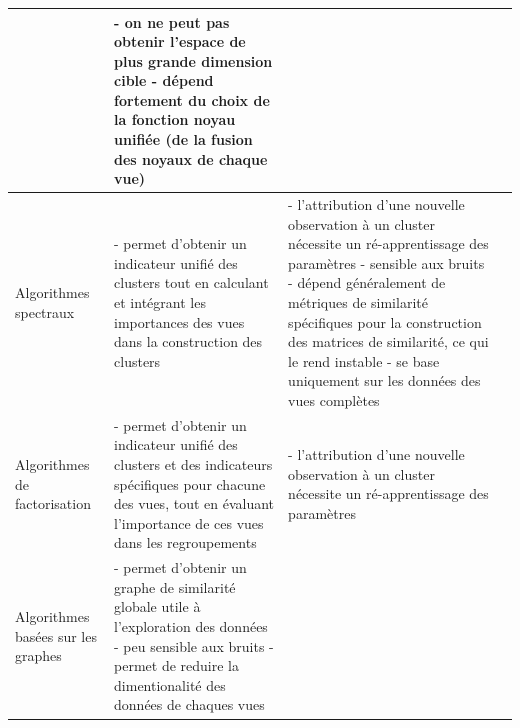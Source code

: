 \documentclass[12pt, french, latin.medieval, a4paper]{report}
\begin{document}
\begin{center}
\begin{longtable}{|p{2.5cm}|p{4.5cm}|p{4.5cm}|p{3cm}|}
                    	&
                    	{- on ne peut pas obtenir l'espace de plus grande dimension cible} \newline\newline
                    	{- dépend fortement du choix de la fonction noyau unifiée (de la fusion des noyaux de chaque vue)}
                    	\\
                    	\hline
                    	Algorithmes spectraux
                    	&
                    	{- permet d'obtenir un indicateur unifié des clusters tout en calculant et intégrant les importances des vues dans la construction des clusters}
                    	&
                    	{- l'attribution d'une nouvelle observation à un cluster nécessite un ré-apprentissage des paramètres} \newline\newline
                        {- sensible aux bruits} \newline\newline
                    	{- dépend généralement de métriques de similarité spécifiques pour la construction des matrices de similarité, ce qui le rend instable } \newline\newline
                    	{- se base uniquement sur les données des vues complètes}
                    	\\
                    	\hline
                    	Algorithmes de factorisation
                    	&
                    	{- permet d'obtenir un indicateur unifié des clusters et des indicateurs spécifiques pour chacune des vues, tout en évaluant l'importance de ces vues dans les regroupements} \newline\newline
                    	&
                    	{- l'attribution d'une nouvelle observation à un cluster nécessite un ré-apprentissage des paramètres}
                    	\\
                    	\hline
                    	Algorithmes basées sur les graphes
                    	&
                    	{- permet d'obtenir un graphe de similarité globale utile à l'exploration des données} \newline\newline
                    	{- peu sensible aux bruits} \newline\newline
                    	{- permet de reduire la dimentionalité des données de chaques vues}
                    	&

\end{longtable}
\end{center}
\end{document}
